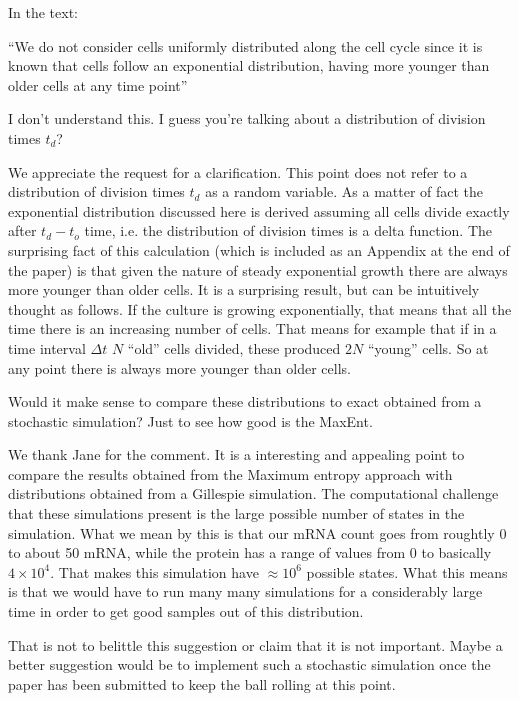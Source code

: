 \begin{tcolorbox}
In the text:

``We do not consider cells uniformly distributed along the cell cycle since it
is known that cells follow an exponential distribution, having more younger than
older cells at any time point''

I don't understand this. I guess you're talking about a distribution of division
times $t_d$?
\end{tcolorbox}

We appreciate the request for a clarification. This point does not refer to a
distribution of division times $t_d$ as a random variable. As a matter of fact
the exponential distribution discussed here is derived assuming all cells divide
exactly after $t_d - t_o$ time, i.e. the distribution of division times is a
delta function. The surprising fact of this calculation (which is included as
an Appendix at the end of the paper) is that given the nature of steady
exponential  growth there are always more younger than older cells. It is a
surprising result, but can be intuitively thought as follows. If the culture is
growing exponentially, that means that all the time there is an increasing
number of cells. That means for example that if in a time interval $\Delta t$
$N$ ``old'' cells divided, these produced $2N$ ``young'' cells. So at any point
there is always more younger than older cells.

\begin{tcolorbox}
Would it make sense to compare these distributions to exact obtained from a
stochastic simulation? Just to see how good is the MaxEnt.
\end{tcolorbox}

We thank Jane for the comment. It is a interesting and appealing point to
compare the results obtained from the Maximum entropy approach with
distributions obtained from a Gillespie simulation. The computational challenge
that these simulations present is the large possible number of states in the
simulation. What we mean by this is that our mRNA count goes from roughtly 0 to
about 50 mRNA, while the protein has a range of values from 0 to basically
$4 \times 10^4$. That makes this simulation have $\approx 10^6$ possible states.
What this means is that we would have to run many many simulations for a
considerably large time in order to get good samples out of this distribution.

That is not to belittle this suggestion or claim that it is not important. Maybe
a better suggestion would be to implement such a stochastic simulation once the
paper has been submitted to keep the ball rolling at this point.


